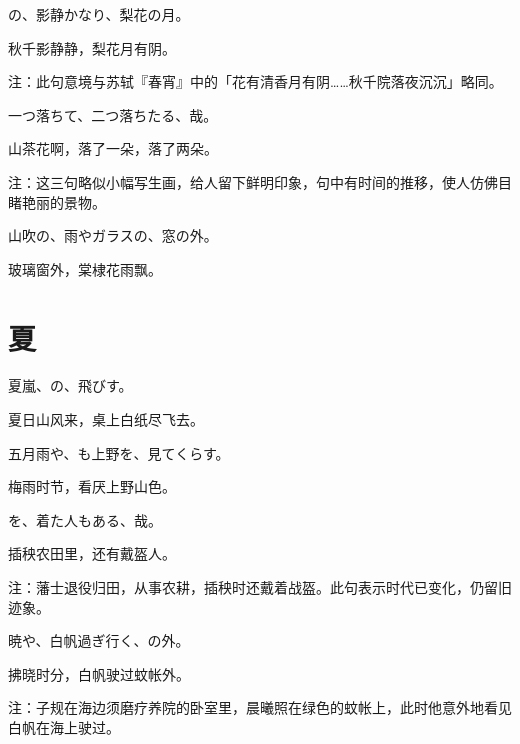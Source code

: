 \begin{haiku}
    {\FH {}の、影静かなり、梨花の月。}

    {\FK 秋千影静静，梨花月有阴。}

    {\FT 注：此句意境与苏轼『春宵』中的「花有清香月有阴……秋千院落夜沉沉」略同。}
\end{haiku}

\begin{haiku}
    {\FH 一つ落ちて、二つ落ちたる、哉。}

    {\FK 山茶花啊，落了一朵，落了两朵。}

    {\FT 注：这三句略似小幅写生画，给人留下鲜明印象，句中有时间的推移，使人仿佛目睹艳丽的景物。}
\end{haiku}

\begin{haiku}
    {\FH 山吹の、雨やガラスの、窓の外。}

    {\FK 玻璃窗外，棠棣花雨飘。}
\end{haiku}

\section{\FK 夏}

\setcounter{haikucounter}{0}

\begin{haiku}
    {\FH 夏嵐、の、飛びす。}

    {\FK 夏日山风来，桌上白纸尽飞去。}
\end{haiku}

\begin{haiku}
    {\FH 五月雨や、も上野を、見てくらす。}

    {\FK 梅雨时节，看厌上野山色。}
\end{haiku}

\begin{haiku}
    {\FH {}を、着た人もある、哉。}

    {\FK 插秧农田里，还有戴盔人。}

    {\FT 注：藩士退役归田，从事农耕，插秧时还戴着战盔。此句表示时代已变化，仍留旧迹象。}
\end{haiku}

\begin{haiku}
    {\FH 暁や、白帆過ぎ行く、の外。}

    {\FK 拂晓时分，白帆驶过蚊帐外。}

    {\FT 注：子规在海边须磨疗养院的卧室里，晨曦照在绿色的蚊帐上，此时他意外地看见白帆在海上驶过。}
\end{haiku}

